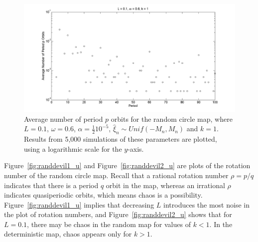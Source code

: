 \begin{figure}[H]\linespread{1}
\caption[Log scale plot of average number of period $p$ orbits for the random circle
map (uniform distribution), for $\alpha=\frac{1}{2}10^{-5}$, $\omega=0.6$ and $k=1$]{Average number of period $p$ orbits for the random circle map,
  where $L=0.1$, $\omega =0.6$, $\alpha = \frac{1}{2}10^{-5}$, $\hat{\xi}_n\sim
  Unif(-M_n,M_n)$ and $k=1$. Results from 5,000 simulations of these
  parameters are plotted, using a logarithmic scale for the
  $y$-axis.}\label{fig:avgcircorbs_ha}
	\begin{center}		\includegraphics[width=.8\textwidth]{figs/rcirc_u_avg_num_logscale_ha.png}
	\end{center}
\end{figure}


Figure~\ref{fig:randdevil1_u} and Figure~\ref{fig:randdevil2_u} are
plots of the rotation number of the random circle map. Recall that a
rational rotation number $\rho = p/q$ indicates that there is a period
$q$ orbit in the map, whereas an irrational $\rho$ indicates
quasiperiodic orbits, which means chaos is a
possibility. Figure~\ref{fig:randdevil1_u} implies that decreasing $L$
introduces the most noise in the plot of rotation numbers, and
Figure~\ref{fig:randdevil2_u} shows that for $L=0.1$, there may be
chaos in the random map for values of $k<1$. In the deterministic map,
chaos appears only for $k>1$.

